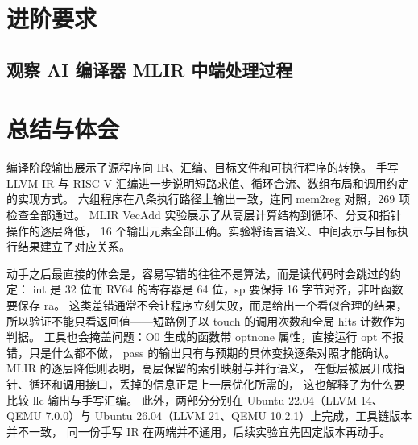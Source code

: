 \documentclass[UTF8,a4paper,10pt]{ctexart}
\begin{document}
\section{进阶要求}
\subsection{观察 AI 编译器 MLIR 中端处理过程}
\begingroup
\let\subsection\subsubsection

\endgroup

\section{总结与体会}
编译阶段输出展示了源程序向 IR、汇编、目标文件和可执行程序的转换。
手写 LLVM IR 与 RISC-V 汇编进一步说明短路求值、循环合流、数组布局和调用约定的实现方式。
六组程序在八条执行路径上输出一致，连同 mem2reg 对照，269 项检查全部通过。
MLIR VecAdd 实验展示了从高层计算结构到循环、分支和指针操作的逐层降低，
16 个输出元素全部正确。实验将语言语义、中间表示与目标执行结果建立了对应关系。

动手之后最直接的体会是，容易写错的往往不是算法，而是读代码时会跳过的约定：
int 是 32 位而 RV64 的寄存器是 64 位，sp 要保持 16 字节对齐，非叶函数要保存 ra。
这类差错通常不会让程序立刻失败，而是给出一个看似合理的结果，
所以验证不能只看返回值——短路例子以 touch 的调用次数和全局 hits 计数作为判据。
工具也会掩盖问题：O0 生成的函数带 optnone 属性，直接运行 opt 不报错，只是什么都不做，
pass 的输出只有与预期的具体变换逐条对照才能确认。
MLIR 的逐层降低则表明，高层保留的索引映射与并行语义，
在低层被展开成指针、循环和调用接口，丢掉的信息正是上一层优化所需的，
这也解释了为什么要比较 llc 输出与手写汇编。
此外，两部分分别在 Ubuntu 22.04（LLVM 14、QEMU 7.0.0）与
Ubuntu 26.04（LLVM 21、QEMU 10.2.1）上完成，工具链版本并不一致，
同一份手写 IR 在两端并不通用，后续实验宜先固定版本再动手。
\end{document}
